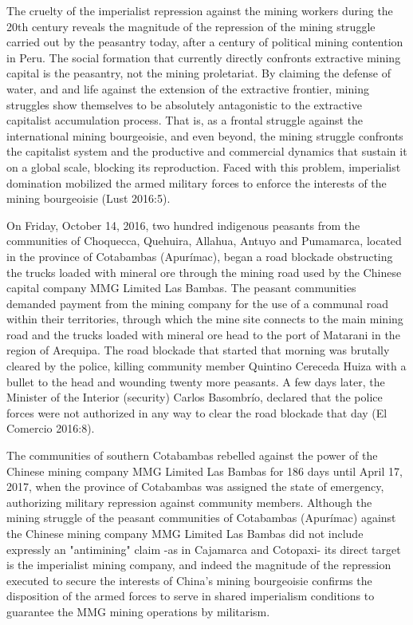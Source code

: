 \documentclass[
]{article}
\begin{document}
The cruelty of the imperialist repression against the mining workers
during the 20th century reveals the magnitude of the repression of the
mining struggle carried out by the peasantry today, after a century of
political mining contention in Peru. The social formation that currently
directly confronts extractive mining capital is the peasantry, not the
mining proletariat. By claiming the defense of water, and and life
against the extension of the extractive frontier, mining struggles show
themselves to be absolutely antagonistic to the extractive capitalist
accumulation process. That is, as a frontal struggle against the
international mining bourgeoisie, and even beyond, the mining struggle
confronts the capitalist system and the productive and commercial
dynamics that sustain it on a global scale, blocking its reproduction.
Faced with this problem, imperialist domination mobilized the armed
military forces to enforce the interests of the mining bourgeoisie (Lust
2016:5).

On Friday, October 14, 2016, two hundred indigenous peasants from the
communities of Choquecca, Quehuira, Allahua, Antuyo and Pumamarca,
located in the province of Cotabambas (Apurímac), began a road blockade
obstructing the trucks loaded with mineral ore through the mining road
used by the Chinese capital company MMG Limited Las Bambas. The peasant
communities demanded payment from the mining company for the use of a
communal road within their territories, through which the mine site
connects to the main mining road and the trucks loaded with mineral ore
head to the port of Matarani in the region of Arequipa. The road
blockade that started that morning was brutally cleared by the police,
killing community member Quintino Cereceda Huiza with a bullet to the
head and wounding twenty more peasants. A few days later, the Minister
of the Interior (security) Carlos Basombrío, declared that the police
forces were not authorized in any way to clear the road blockade that
day (El Comercio 2016:8).

The communities of southern Cotabambas rebelled against the power of the
Chinese mining company MMG Limited Las Bambas for 186 days until April
17, 2017, when the province of Cotabambas was assigned the state of
emergency, authorizing military repression against community members.
Although the mining struggle of the peasant communities of Cotabambas
(Apurímac) against the Chinese mining company MMG Limited Las Bambas did
not include expressly an "antimining" claim -as in Cajamarca and
Cotopaxi- its direct target is the imperialist mining company, and
indeed the magnitude of the repression executed to secure the interests
of China's mining bourgeoisie confirms the disposition of the armed
forces to serve in shared imperialism conditions to guarantee the MMG
mining operations by militarism.
\end{document}

